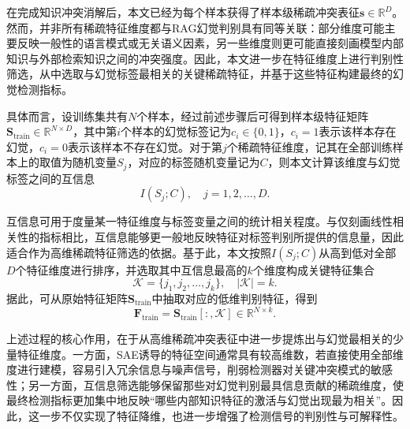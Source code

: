
在完成知识冲突消解后，本文已经为每个样本获得了样本级稀疏冲突表征$\mathbf{s}\in\mathbb{R}^{D}$。然而，并非所有稀疏特征维度都与RAG幻觉判别具有同等关联：部分维度可能主要反映一般性的语言模式或无关语义因素，另一些维度则更可能直接刻画模型内部知识与外部检索知识之间的冲突强度。因此，本文进一步在特征维度上进行判别性筛选，从中选取与幻觉标签最相关的关键稀疏特征，并基于这些特征构建最终的幻觉检测指标。

具体而言，设训练集共有$N$个样本，经过前述步骤后可得到样本级特征矩阵$\mathbf{S}_{\mathrm{train}}\in\mathbb{R}^{N\times D}$，其中第$i$个样本的幻觉标签记为$c_i\in\{0,1\}$，$c_i=1$表示该样本存在幻觉，$c_i=0$表示该样本不存在幻觉。对于第$j$个稀疏特征维度，记其在全部训练样本上的取值为随机变量$S_j$，对应的标签随机变量记为$C$，则本文计算该维度与幻觉标签之间的互信息
\begin{equation}
I(S_j;C),\quad j=1,2,\dots,D.
\end{equation}

互信息可用于度量某一特征维度与标签变量之间的统计相关程度。与仅刻画线性相关性的指标相比，互信息能够更一般地反映特征对标签判别所提供的信息量，因此适合作为高维稀疏特征筛选的依据。基于此，本文按照$I(S_j;C)$从高到低对全部$D$个特征维度进行排序，并选取其中互信息最高的$k$个维度构成关键特征集合
\begin{equation}
\mathcal{K}=\{j_1,j_2,\dots,j_k\},\quad |\mathcal{K}|=k.
\end{equation}
据此，可从原始特征矩阵$\mathbf{S}_{\mathrm{train}}$中抽取对应的低维判别特征，得到
\begin{equation}
\mathbf{F}_{\mathrm{train}}=\mathbf{S}_{\mathrm{train}}[:,\mathcal{K}]\in\mathbb{R}^{N\times k}.
\end{equation}

上述过程的核心作用，在于从高维稀疏冲突表征中进一步提炼出与幻觉最相关的少量特征维度。一方面，SAE诱导的特征空间通常具有较高维数，若直接使用全部维度进行建模，容易引入冗余信息与噪声信号，削弱检测器对关键冲突模式的敏感性；另一方面，互信息筛选能够保留那些对幻觉判别最具信息贡献的稀疏维度，使最终检测指标更加集中地反映“哪些内部知识特征的激活与幻觉出现最为相关”。因此，这一步不仅实现了特征降维，也进一步增强了检测信号的判别性与可解释性。

